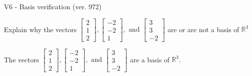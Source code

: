 \begin{exercise}
  \begin{exerciseTitle}V6 - Basis verification (ver. 972)\end{exerciseTitle}
  \begin{exerciseStatement}
    Explain why the vectors \(\left[\begin{array}{r}
2 \\
1 \\
2
\end{array}\right] , \left[\begin{array}{r}
-2 \\
-2 \\
1
\end{array}\right] , \text{ and } \left[\begin{array}{r}
3 \\
3 \\
-2
\end{array}\right]\) are or are not a basis of \(\mathbb{R}^3\)	


  \end{exerciseStatement}
  \begin{exerciseAnswer}
   The vectors \(\left[\begin{array}{r}
2 \\
1 \\
2
\end{array}\right] , \left[\begin{array}{r}
-2 \\
-2 \\
1
\end{array}\right] , \text{ and } \left[\begin{array}{r}
3 \\
3 \\
-2
\end{array}\right]\) 
  	 are  a basis of \(\mathbb{R}^3\).
  


  \end{exerciseAnswer}
\end{exercise}